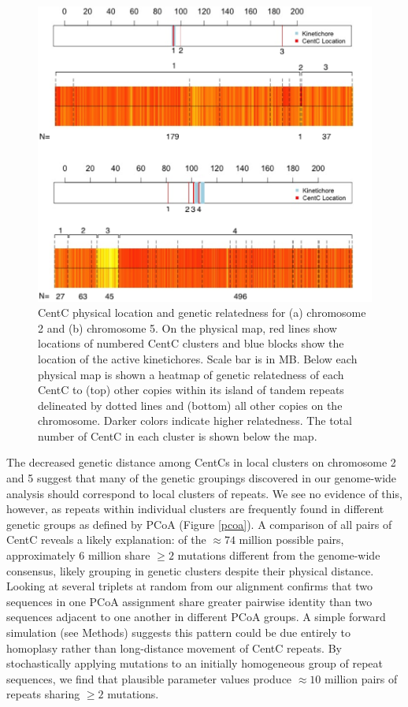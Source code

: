 {\begin{figure}[h]
\centering
\includegraphics[width=1\textwidth]{heatmap.png}
\caption{CentC physical location and genetic relatedness for (a) chromosome 2 and (b) chromosome 5.  On the physical map, red lines show locations of numbered CentC clusters and blue blocks show the location of the active kinetichores.  Scale bar is in MB.  Below each physical map is shown a heatmap of genetic relatedness of each CentC to (top) other copies within its island of tandem repeats delineated by dotted lines and (bottom) all other copies on the chromosome.  Darker colors indicate higher relatedness.  The total number of CentC in each cluster is shown below the map.  
}
\label{heatmap}    
\end{figure}

The decreased genetic distance among CentCs in local clusters on chromosome 2 and 5 suggest that many of the genetic groupings discovered in our genome-wide analysis should correspond to local clusters of repeats. We see no evidence of this, however, as repeats within individual clusters are frequently found in different genetic groups as defined by PCoA (Figure \ref{pcoa}).  A comparison of all pairs of CentC reveals a likely explanation: of the $\approx 74$ million possible pairs,  approximately 6 million share $\geq 2$ mutations different from the genome-wide consensus, likely grouping in genetic clusters despite their physical distance.  Looking at several triplets at random from our alignment confirms that two sequences in one PCoA assignment share greater pairwise identity than two sequences adjacent to one another in different PCoA groups.  A simple forward simulation (see Methods) suggests this pattern could be due entirely to homoplasy rather than long-distance movement of CentC repeats.  By stochastically applying mutations to an initially homogeneous group of repeat sequences, we find that plausible parameter values produce $\approx 10$ million pairs of repeats sharing $\geq 2$ mutations.      

}
